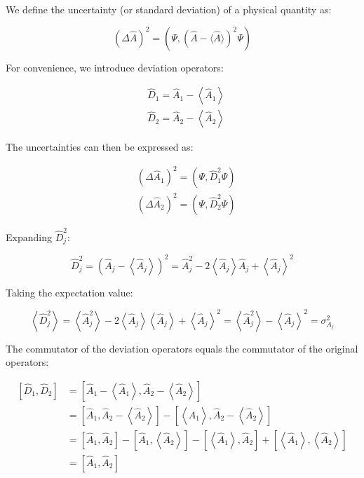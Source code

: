 \documentclass[italian]{HKNdocument}
\begin{document}
We define the uncertainty (or standard deviation) of a physical quantity as:

\begin{equation*}
(\Delta \hat{A})^{2}=\left(\Psi,(\hat{A}-\langle\hat{A}\rangle)^{2} \Psi\right) \tag{7.4}
\end{equation*}

For convenience, we introduce deviation operators:

\begin{align*}
& \hat{D}_{1}=\hat{A}_{1}-\left\langle\hat{A}_{1}\right\rangle \\
& \hat{D}_{2}=\hat{A}_{2}-\left\langle\hat{A}_{2}\right\rangle \tag{7.5}
\end{align*}

The uncertainties can then be expressed as:

\begin{align*}
& \left(\Delta \hat{A}_{1}\right)^{2}=\left(\Psi, \hat{D}_{1}^{2} \Psi\right) \\
& \left(\Delta \hat{A}_{2}\right)^{2}=\left(\Psi, \hat{D}_{2}^{2} \Psi\right) \tag{7.6}
\end{align*}

Expanding $\hat{D}_j^2$:

\begin{equation*}
\hat{D}_{j}^{2}=\left(\hat{A}_{j}-\left\langle\hat{A}_{j}\right\rangle\right)^{2}=\hat{A}_{j}^{2}-2\left\langle\hat{A}_{j}\right\rangle \hat{A}_{j}+\left\langle\hat{A}_{j}\right\rangle^{2} \tag{7.7}
\end{equation*}

Taking the expectation value:

\begin{equation*}
\left\langle\hat{D}_{j}^{2}\right\rangle=\left\langle\hat{A}_{j}^{2}\right\rangle-2\left\langle\hat{A}_{j}\right\rangle\left\langle\hat{A}_{j}\right\rangle+\left\langle\hat{A}_{j}\right\rangle^{2}=\left\langle\hat{A}_{j}^{2}\right\rangle-\left\langle\hat{A}_{j}\right\rangle^{2}=\sigma_{A_{j}}^{2} \tag{7.8}
\end{equation*}

The commutator of the deviation operators equals the commutator of the original operators:

\begin{align*}
{\left[\hat{D}_{1}, \hat{D}_{2}\right] } & =\left[\hat{A}_{1}-\left\langle\hat{A}_{1}\right\rangle, \hat{A}_{2}-\left\langle\hat{A}_{2}\right\rangle\right] \\
& =\left[\hat{A}_{1}, \hat{A}_{2}-\left\langle\hat{A}_{2}\right\rangle\right]-\left[\left\langle\hat{A}_{1}\right\rangle, \hat{A}_{2}-\left\langle\hat{A}_{2}\right\rangle\right] \\
& =\left[\hat{A}_{1}, \hat{A}_{2}\right]-\left[\hat{A}_{1},\left\langle\hat{A}_{2}\right\rangle\right]-\left[\left\langle\hat{A}_{1}\right\rangle, \hat{A}_{2}\right]+\left[\left\langle\hat{A}_{1}\right\rangle,\left\langle\hat{A}_{2}\right\rangle\right]  \tag{7.9}\\
& =\left[\hat{A}_{1}, \hat{A}_{2}\right]
\end{align*}
\end{document}
